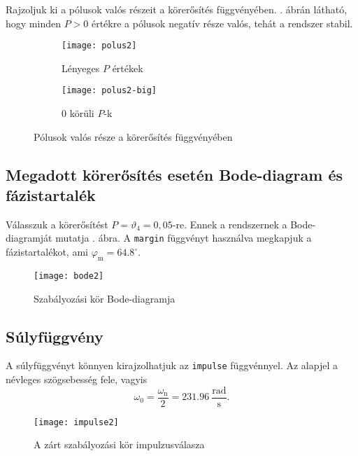 Rajzoljuk ki a pólusok valós részeit a körerősítés függvényében.
. ábrán látható, hogy minden $P>0$ értékre a pólusok
negatív része valós, tehát a rendszer stabil.
\begin{figure}[H]
	\centering
	\begin{subfigure}{.49\textwidth}
		\texttt{[image: polus2]}
		\caption{Lényeges $P$ értékek}
	\end{subfigure}
	\begin{subfigure}{.49\textwidth}
		\texttt{[image: polus2-big]}
		\caption{0 körüli $P$-k}
	\end{subfigure}
	\caption{Pólusok valós része a körerősítés függvényében}
	\label{fig:poles2}
\end{figure}


\subsection{Megadott körerősítés esetén Bode-diagram és fázistartalék}

Válasszuk a körerősítést $P=\vartheta_4 = 0,05$-re.
Ennek a rendszernek a Bode-diagramját mutatja . ábra.
A \verb|margin| függvényt használva megkapjuk a fázistartalékot,
ami $\varphi_\text{m}=64.8^\circ$.

\begin{figure}[H]
	\centering
	\texttt{[image: bode2]}
	\caption{Szabályozási kör Bode-diagramja}
	\label{fig:bode2}
\end{figure}


\subsection{Súlyfüggvény}

A súlyfüggvényt könnyen kirajzolhatjuk az \verb|impulse| függvénnyel. Az alapjel
a névleges szögsebesség fele, vagyis
\begin{equation}
	\omega_0 = \frac{\omega_\text{n}}{2} = 231.96~\frac{\text{rad}}{\text{s}}.
\end{equation}

\begin{figure}[H]
	\centering
	\texttt{[image: impulse2]}
	\caption{A zárt szabályozási kör impulzusválasza}
	\label{fig:impulse2}
\end{figure}

